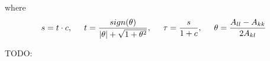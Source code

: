 \documentclass[12pt,twoside]{article}
\begin{document}
where
\[ s=t\cdot c, \hspace{5mm} t = \frac{sign(\theta)}{|\theta|+ \sqrt{1+\theta^2}}, \hspace{5mm} \tau = \frac{s}{1+c}, \hspace{5mm} \theta = \frac{A_{ll}-A_{kk}}{2A_{kl}}  \]


\newpage

TODO:
\end{document}
